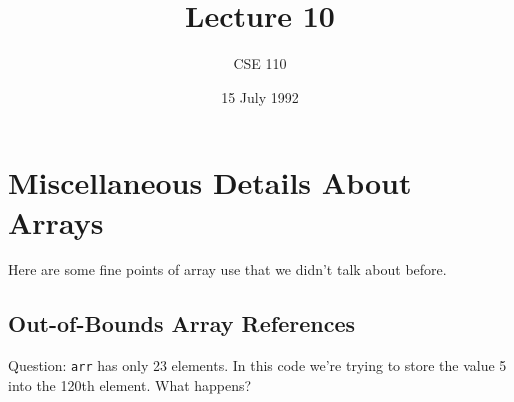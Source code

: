 %
%
%


\def\brac#1{$<$#1$>$}
\def\Int{{\tt int}}
\def\int{\brac{\Int}}
\def\int{\brac{\Int}}
\def\Shortint{{\tt short~int}}
\def\shortint{\brac{\Shortint}}
\def\Longint{{\tt long~int}}
\def\longint{\brac{\Longint}}
\def\Float{{\tt float}}
\def\float{\brac{\Float}}
\def\Double{{\tt double}}
\def\double{\brac{\Double}}
\def\Char{{\tt char}}
\def\chr{\brac{\Char}}
\def\Void{{\tt void}}
\def\void{\brac{\Void}}

\def\ptr#1{pointer~to #1}
\def\p2#1{\brac{\ptr#1}}
\def\Ano#1#2{array~of {#1}~#2s}
\def\ano#1#2{\brac{\Ano#1#2}}
\def\Ao#1{array~of #1}
\def\ao#1{\brac{\Ao#1}}

\def\breakhere{\mbox{$\otimes$}}
\parskip 8pt


\title{Lecture 10}
\author{CSE 110}
\date{15 July 1992}

\pagestyle{fancy}
\rhead{\thepage}
\cfoot{}





\maketitle

\section{Miscellaneous Details About Arrays}

Here are some fine points of array use that we didn't talk about before.

\subsection{Out-of-Bounds Array References}

Question: {\tt arr} has only 23 elements.  In this code we're trying to
store the value 5 into the 120th element.  What happens?

\begin{flushleft}
\verb% . . . % \\*
\verb% int arr[23];% \\*
\verb% % \\*
\verb% arr[119] = 5;% 
\end{flushleft}

